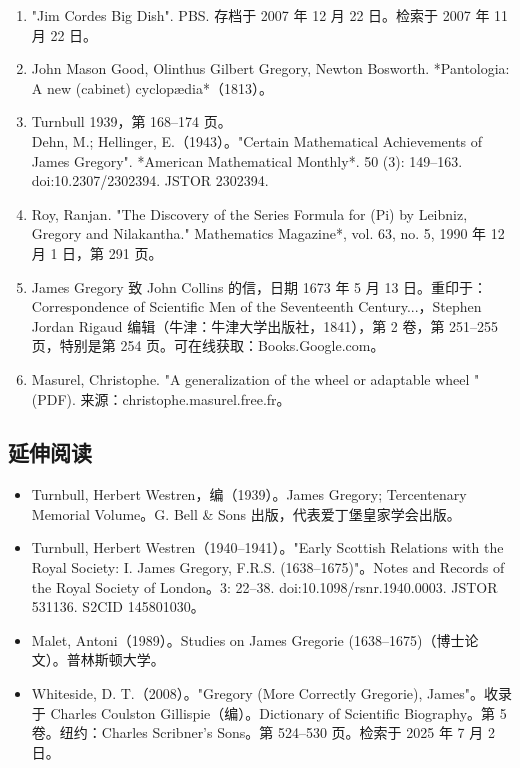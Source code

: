 \begin{enumerate}
\item "Jim Cordes Big Dish". PBS. 存档于 2007 年 12 月 22 日。检索于 2007 年 11 月 22 日。
\item John Mason Good, Olinthus Gilbert Gregory, Newton Bosworth. *Pantologia: A new (cabinet) cyclopædia*（1813）。
\item Turnbull 1939，第 168–174 页。\\
Dehn, M.; Hellinger, E.（1943）。"Certain Mathematical Achievements of James Gregory". *American Mathematical Monthly*. 50 (3): 149–163. doi:10.2307/2302394. JSTOR 2302394.
\item Roy, Ranjan. "The Discovery of the Series Formula for (Pi) by Leibniz, Gregory and Nilakantha." Mathematics Magazine*, vol. 63, no. 5, 1990 年 12 月 1 日，第 291 页。
\item James Gregory 致 John Collins 的信，日期 1673 年 5 月 13 日。重印于：Correspondence of Scientific Men of the Seventeenth Century...，Stephen Jordan Rigaud 编辑（牛津：牛津大学出版社，1841），第 2 卷，第 251–255 页，特别是第 254 页。可在线获取：Books.Google.com。
\item Masurel, Christophe. "A generalization of the wheel or adaptable wheel " (PDF). 来源：christophe.masurel.free.fr。
\end{enumerate}
\subsection{延伸阅读}
\begin{itemize}
\item Turnbull, Herbert Westren，编（1939）。James Gregory; Tercentenary Memorial Volume。G. Bell & Sons 出版，代表爱丁堡皇家学会出版。
\item Turnbull, Herbert Westren（1940–1941）。"Early Scottish Relations with the Royal Society: I. James Gregory, F.R.S. (1638–1675)"。Notes and Records of the Royal Society of London。3: 22–38. doi:10.1098/rsnr.1940.0003. JSTOR 531136. S2CID 145801030。
\item Malet, Antoni（1989）。Studies on James Gregorie (1638–1675)（博士论文）。普林斯顿大学。
\item Whiteside, D. T.（2008）。"Gregory (More Correctly Gregorie), James"。收录于 Charles Coulston Gillispie（编）。Dictionary of Scientific Biography。第 5 卷。纽约：Charles Scribner's Sons。第 524–530 页。检索于 2025 年 7 月 2 日。
\end{itemize}

